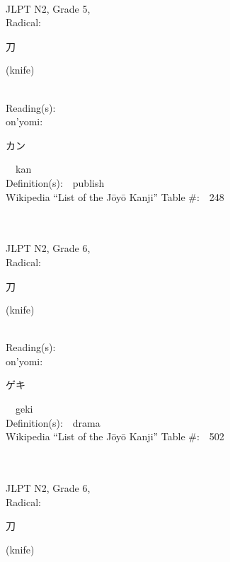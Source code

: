 \begin{multicols}{2}
{\fontsize{34pt}{40pt}  }\ \ \\  %
{JLPT N2, Grade 5, \\Radical:\ \ {\begin{CJK}{UTF8}{min} 刀 \end{CJK}} (knife) } \\
Reading(s):\ \ \\
{\hspace*{1em}}on'yomi:\ \ \\
{\hspace*{2em}}{\begin{CJK}{UTF8}{min} カン \end{CJK}}\ \ kan\ \ \\
Definition(s):\ \ publish \\
Wikipedia ``List of the J\=oy\=o Kanji'' Table \#:\ \ 248 \\
\ \ \\
{\fontsize{34pt}{40pt}  }\ \ \\  %
{JLPT N2, Grade 6, \\Radical:\ \ {\begin{CJK}{UTF8}{min} 刀 \end{CJK}} (knife) } \\
Reading(s):\ \ \\
{\hspace*{1em}}on'yomi:\ \ \\
{\hspace*{2em}}{\begin{CJK}{UTF8}{min} ゲキ \end{CJK}}\ \ geki\ \ \\
Definition(s):\ \ drama \\
Wikipedia ``List of the J\=oy\=o Kanji'' Table \#:\ \ 502 \\
\ \ \\
{\fontsize{34pt}{40pt}  }\ \ \\  %
{JLPT N2, Grade 6, \\Radical:\ \ {\begin{CJK}{UTF8}{min} 刀 \end{CJK}} (knife) } \\

\end{multicols}
